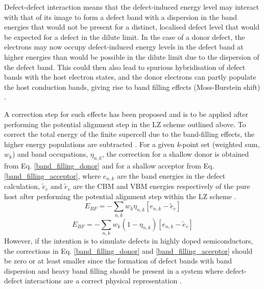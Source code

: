 \documentclass[11pt, twoside]{report}
\begin{document}
Defect-defect interaction means that the defect-induced energy level may interact with that of its image to form a defect band with a dispersion in the band energies that would not be present for a distinct, localised defect level that would be expected for a defect in the dilute limit. In the case of a donor defect, the electrons may now occupy defect-induced energy levels in the defect band at higher energies than would be possible in the dilute limit due to the dispersion of the defect band. This could then also lead to spurious hybridisation of defect bands with the host electron states, and the donor electrons can partly populate the host conduction bands, giving rise to band filling effects (Moss-Burstein shift) \cite{Lany_defects_2008}.

A correction step for such effects has been proposed \cite{CIS_defects, Lany_defects_2008, Lany_defects} and is to be applied after performing the potential alignment step in the LZ scheme outlined above.
To correct the total energy of the finite supercell due to the band-filling effects, the higher energy populations are subtracted \cite{CIS_defects}.
For a given \textit{k}-point set (weighted sum, $w_k$) and band occupations, $\eta_{n,k}$, the correction for a shallow donor is obtained from Eq. \ref{band_filling_donor} and for a shallow acceptor from Eq. \ref{band_filling_acceptor}, where $e_{n,k}$ are the band energies in the defect calculation, $\tilde{e}_c$ and $\tilde{e}_v$ are the CBM and VBM energies respectively of the pure host after performing the potential alignment step within the LZ scheme \cite{pylada}.
\begin{equation}\label{band_filling_donor}
E_{BF} = - \sum_{n,k} w_k \eta_{n,k} [e_{n,k} - \tilde{e}_c]
\end{equation}
\begin{equation}\label{band_filling_acceptor}
E_{BF} = - \sum_{n,k} w_k (1 - \eta_{n,k}) [e_{n,k} - \tilde{e}_v]
\end{equation}
However, if the intention is to simulate defects in highly doped semiconductors, the corrections in Eq. \ref{band_filling_donor} and \ref{band_filling_acceptor} should be zero or at least smaller since the formation of defect bands with band dispersion and heavy band filling should be present in a system where defect-defect interactions are a correct physical representation \cite{CIS_defects}.
\end{document}
